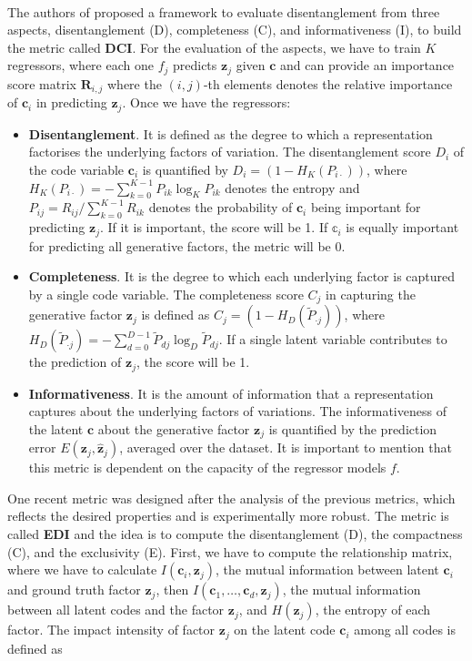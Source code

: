 \\
The authors of \cite{eastwood2018a} proposed a framework to evaluate disentanglement from three aspects, disentanglement (D), completeness (C), and informativeness (I), to build the metric called \textbf{DCI}. For the evaluation of the aspects, we have to train $K$ regressors, where each one $f_j$ predicts $\mathbf{z}_j$ given $\mathbf{c}$ and can provide an importance score matrix $\mathbf{R}_{i,j}$ where the $(i,j)$-th elements denotes the relative importance of $\mathbf{c}_i$ in predicting $\mathbf{z}_j$. Once we have the regressors: 
\begin{itemize}
    \item \textbf{Disentanglement}. It is defined as the degree to which a representation factorises the underlying factors of variation. The disentanglement score $D_i$ of the code variable $\mathbf{c}_i$ is quantified by $D_i = (1 - H_K(P_{i\cdot}))$, where $H_K(P_{i\cdot})=-\sum_{k=0}^{K-1} P_{ik}\log_K P_{ik}$ denotes the entropy and $P_{ij} = R_{ij} / \sum_{k=0}^{K-1} R_{ik}$ denotes the probability of $\mathbf{c}_i$ being important for predicting $\mathbf{z}_j$. If it is important, the score will be 1. If $\mathbb{c}_i$ is equally important for predicting all generative factors, the metric will be 0. 
    \item \textbf{Completeness}. It is the degree to which each underlying factor is captured by a single code variable. The completeness score $C_j$ in capturing the generative factor $\mathbf{z}_j$ is defined as $C_j=(1-H_D(\tilde P_{\cdot j}))$, where $H_D(\tilde P_{\cdot j}) = -\sum_{d=0}^{D-1}\tilde P_{dj}\log_D \tilde P_{dj}$. If a single latent variable contributes to the prediction of $\mathbf{z}_j$, the score will be 1. 
    \item \textbf{Informativeness}. It is the amount of information that a representation captures about the underlying factors of variations. The informativeness of the latent $\mathbf{c}$ about the generative factor $\mathbf{z}_j$ is quantified by the prediction error $E(\mathbf{z}_j, \mathbf{\hat z}_j)$, averaged over the dataset. It is important to mention that this metric is dependent on the capacity of the regressor models $f$. 
\end{itemize} 
One recent metric was designed after the analysis of the previous metrics, which reflects the desired properties and is experimentally more robust. The metric is called \textbf{EDI} \cite{julka2024improvedmetricevaluatingdisentangled} and the idea is to compute the disentanglement (D), the compactness (C), and the exclusivity (E). First, we have to compute the relationship matrix, where we have to calculate $I(\mathbf{c}_i, \mathbf{z}_j)$, the mutual information between latent $\mathbf{c}_i$ and ground truth factor $\mathbf{z}_j$, then $I(\mathbf{c}_1,\dots,\mathbf{c}_d,\mathbf{z}_j)$, the mutual information between all latent codes and the factor $\mathbf{z}_j$, and $H(\mathbf{z}_j)$, the entropy of each factor. The impact intensity of factor $\mathbf{z}_j$ on the latent code $\mathbf{c}_i$ among all codes is defined as 
